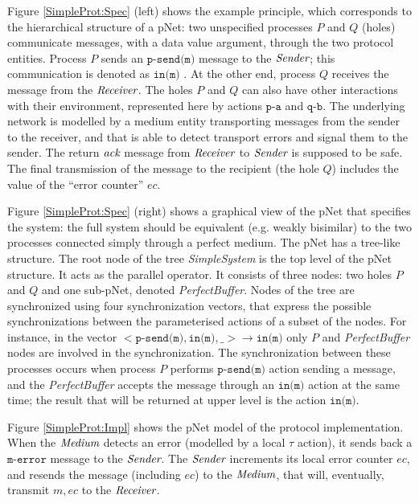 \documentclass{lmcs}
\newcommand{\nounderline}[1]{#1}
\begin{document}
Figure \ref{SimpleProt:Spec} (left) shows the example principle, which corresponds to the hierarchical structure of a pNet: two unspecified
processes $P$ and $Q$ (holes) communicate messages, with a data value
argument, through the two protocol entities. Process $P$ sends an $\texttt{p-send(m)}$ message to the $\symb{Sender}$; this communication is denoted as $\texttt{\nounderline{in(m)}}$%
.
At the other end, process $Q$ receives the message from the $\symb{Receiver}$. The holes $P$ and $Q$ can also have other interactions with their environment, represented here by actions $\texttt{p-a}$ and $\texttt{q-b}$. The underlying network is modelled by a medium entity transporting messages from the sender to the receiver, and that is able to detect transport errors and signal them to the sender. The return $\symb{ack}$ message from $\symb{Receiver}$ to $\symb{Sender}$ is supposed to be safe. The final transmission of the message to the recipient (the hole $Q$) includes the value of the ``error counter'' $ec$.


Figure \ref{SimpleProt:Spec} (right) shows a graphical view of the pNet that specifies the system:
the full system should be equivalent (e.g.  weakly bisimilar)
to the two processes connected simply through a perfect medium.  
The pNet has a tree-like structure.  The root node of the tree {\it SimpleSystem} is the top level of the pNet structure. It acts as the parallel operator. It consists of three nodes: two holes $P$ and $Q$ and one sub-pNet, denoted {\it PerfectBuffer}. Nodes of the tree are synchronized using four synchronization vectors, that  express the possible synchronizations between the parameterised actions of a subset of the nodes. For instance, in the vector $< \texttt{p-send(m)},\texttt{in(m)},\_> \rightarrow \texttt{\nounderline{in(m)}}$ only $P$ and {\it PerfectBuffer} nodes are involved in the synchronization. The synchronization between these processes occurs when  process $P$  performs $\texttt{p-send(m)}$  action sending a message, and  the {\it PerfectBuffer} accepts the message through an $\texttt{in(m)}$ action  at the same time; the result that will be returned at upper level is the action  $\texttt{\nounderline{in(m)}}$.


Figure \ref{SimpleProt:Impl} shows the pNet model of the protocol implementation. When the $\symb{Medium}$ detects an error (modelled by a local $\tau$ action), it sends back a $\texttt{m-error}$ message to the $\symb{Sender}$. The $\symb{Sender}$ increments its local error counter $ec$, and resends the message (including $ec$) to the $\symb{Medium}$, that will, eventually, transmit $m,ec$ to the $\symb{Receiver}$. 
\end{document}
